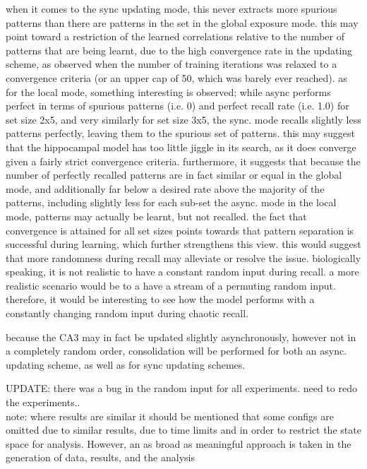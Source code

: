 when it comes to the sync updating mode, this never extracts more spurious patterns than there are patterns in the set in the global exposure mode. this may point toward a restriction of the learned correlations relative to the number of patterns that are being learnt, due to the high convergence rate in the updating scheme, as observed when the number of training iterations was relaxed to a convergence criteria (or an upper cap of 50, which was barely ever reached).
as for the local mode, something interesting is observed; while async performs perfect in terms of spurious patterns (i.e. 0) and perfect recall rate (i.e. 1.0) for set size 2x5, and very similarly for set size 3x5, the sync. mode recalls slightly less patterns perfectly, leaving them to the spurious set of patterns. this may suggest that the hippocampal model has too little jiggle in its search, as it does converge given a fairly strict convergence criteria. furthermore, it suggests that because the number of perfectly recalled patterns are in fact similar or equal in the global mode, and additionally far below a desired rate above the majority of the patterns, including slightly less for each sub-set the async. mode in the local mode, patterns may actually be learnt, but not recalled. the fact that convergence is attained for all set sizes points towards that pattern separation is successful during learning, which further strengthens this view. this would suggest that more randomness during recall may alleviate or resolve the issue. biologically speaking, it is not realistic to have a constant random input during recall. a more realistic scenario would be to a have a stream of a permuting random input. therefore, it would be interesting to see how the model performs with a constantly changing random input during chaotic recall.

because the CA3 may in fact be updated slightly asynchronously, however not in a completely random order, consolidation will be performed for both an async. updating scheme, as well as for sync updating schemes.

UPDATE: there was a bug in the random input for all experiments. need to redo the experiments..
\\

note: where results are similar it should be mentioned that some configs are omitted due to similar results, due to time limits and in order to restrict the state space for analysis. However, an as broad as meaningful approach is taken in the generation of data, results, and the analysis


